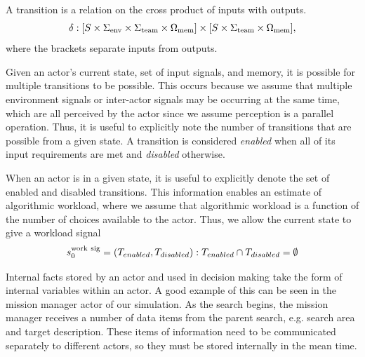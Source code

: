 A transition is a relation on the cross product of inputs with outputs.
\begin{equation}
 \delta:[S\times\Sigma_{\rm env}\times\Sigma_{\rm team}\times\Omega_{\rm mem}] \times [S\times \Sigma_{\rm team} \times \Omega_{\rm mem}], 
\end{equation} 
where the brackets separate inputs from outputs.
 
Given an actor's current state, set of input signals, and memory, it is possible for multiple transitions to be possible.  This occurs because we assume that multiple environment signals or inter-actor signals may be occurring at the same time, which are all perceived by the actor since we assume perception is a parallel operation.  Thus, it is useful to explicitly note the number of transitions that are possible from a given state.   A transition is considered {\em enabled} when all of its input
requirements are met and {\em disabled} otherwise. 

When an actor is in a given state, it is useful to explicitly denote the set of enabled and disabled transitions.  This information enables an estimate of algorithmic workload, where we assume that algorithmic workload is a function of the number of choices available to the actor.  Thus, we allow the current state to give a workload signal
\begin{equation}
	s_0^{\rm work\  sig} = (T_{enabled}, T_{disabled}) : T_{enabled} \cap T_{disabled} = \emptyset
 \label{eq:state}
\end{equation}

Internal facts stored by an actor and used in decision making take the form of internal variables within an actor. A good example of this can be seen in the mission manager actor of our simulation. As the search begins, the mission manager receives a number of data items from the parent search, e.g. search area and target description. These items of information need to be communicated separately to different actors, so they must be stored internally in the mean time. 
